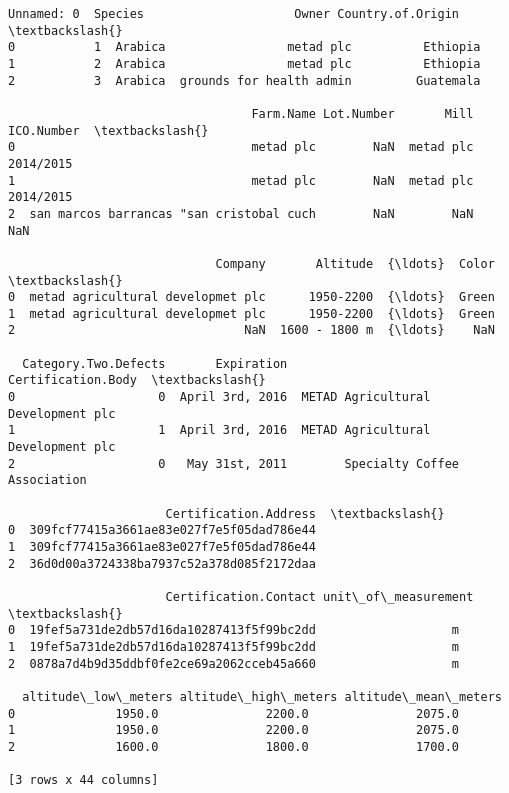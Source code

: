 \documentclass[11pt]{article}
\makeatletter
\newcommand{\boxspacing}{\kern\kvtcb@left@rule\kern\kvtcb@boxsep}
\newcommand{\prompt}[4]{
        {\ttfamily\llap{{\color{#2}[#3]:\hspace{3pt}#4}}\vspace{-\baselineskip}}
    }
\makeatother
\begin{document}
            \begin{tcolorbox}[breakable, size=fbox, boxrule=.5pt, pad at break*=1mm, opacityfill=0]
\prompt{Out}{outcolor}{2}{\boxspacing}
\begin{Verbatim}[commandchars=\\\{\}]
   Unnamed: 0  Species                     Owner Country.of.Origin  \textbackslash{}
0           1  Arabica                 metad plc          Ethiopia
1           2  Arabica                 metad plc          Ethiopia
2           3  Arabica  grounds for health admin         Guatemala

                                  Farm.Name Lot.Number       Mill ICO.Number  \textbackslash{}
0                                 metad plc        NaN  metad plc  2014/2015
1                                 metad plc        NaN  metad plc  2014/2015
2  san marcos barrancas "san cristobal cuch        NaN        NaN        NaN

                             Company       Altitude  {\ldots}  Color  \textbackslash{}
0  metad agricultural developmet plc      1950-2200  {\ldots}  Green
1  metad agricultural developmet plc      1950-2200  {\ldots}  Green
2                                NaN  1600 - 1800 m  {\ldots}    NaN

  Category.Two.Defects       Expiration                  Certification.Body  \textbackslash{}
0                    0  April 3rd, 2016  METAD Agricultural Development plc
1                    1  April 3rd, 2016  METAD Agricultural Development plc
2                    0   May 31st, 2011        Specialty Coffee Association

                      Certification.Address  \textbackslash{}
0  309fcf77415a3661ae83e027f7e5f05dad786e44
1  309fcf77415a3661ae83e027f7e5f05dad786e44
2  36d0d00a3724338ba7937c52a378d085f2172daa

                      Certification.Contact unit\_of\_measurement  \textbackslash{}
0  19fef5a731de2db57d16da10287413f5f99bc2dd                   m
1  19fef5a731de2db57d16da10287413f5f99bc2dd                   m
2  0878a7d4b9d35ddbf0fe2ce69a2062cceb45a660                   m

  altitude\_low\_meters altitude\_high\_meters altitude\_mean\_meters
0              1950.0               2200.0               2075.0
1              1950.0               2200.0               2075.0
2              1600.0               1800.0               1700.0

[3 rows x 44 columns]
\end{Verbatim}
\end{tcolorbox}
        
\end{document}
